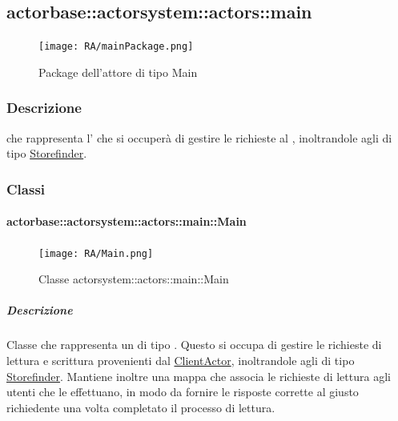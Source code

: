 \documentclass{scalatekids-article}
\begin{document}

\subsection{actorbase::actorsystem::actors::main}
\label{sec:actorbase::actorsystem::actors::main}

\begin{figure}[H]
  \begin{center}
    \texttt{[image: RA/mainPackage.png]}
    \caption{Package dell'attore di tipo Main}
  \end{center}
\end{figure}

\subsubsection{Descrizione}
 che rappresenta l' che si occuperà di gestire le
richieste al , inoltrandole agli  di tipo
\hyperref[sec:actorbase::actorsystem::actors::storefinder::Storefinder]{Storefinder}.

\subsubsection{Classi}

\paragraph{actorbase::actorsystem::actors::main::Main}
\label{sec:actorbase::actorsystem::actors::main::Main}

\begin{figure}[H]
  \begin{center}
    \texttt{[image: RA/Main.png]}
    \caption{Classe actorsystem::actors::main::Main}
  \end{center}
\end{figure}

\subparagraph{Descrizione}
Classe che rappresenta un  di tipo . Questo
 si occupa di gestire le richieste di lettura e scrittura
provenienti dal
\hyperref[sec:actorbase::actorsystem::actors::clientactor::ClientActor]{ClientActor},
inoltrandole agli  di tipo
\hyperref[sec:actorbase::actorsystem::actors::storefinder::Storefinder]{Storefinder}.
Mantiene inoltre una mappa che associa le richieste di lettura agli utenti che
le effettuano, in modo da fornire le risposte corrette al giusto richiedente una
volta completato il processo di lettura.
\end{document}
